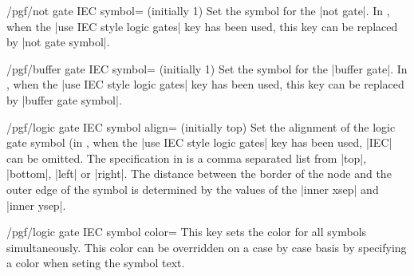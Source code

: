 \begin{key}{/pgf/not gate IEC symbol= (initially 1)}
  Set the symbol for the |not gate|.  
  In \tikzname, when the |use IEC style logic gates| key has been 
  used, this key can be replaced by |not gate symbol|.
\end{key}

\begin{key}{/pgf/buffer gate IEC symbol= (initially 1)}
  Set the symbol for the |buffer gate|.  
  In \tikzname, when the |use IEC style logic gates| key has been 
  used, this key can be replaced by |buffer gate symbol|.
\end{key}

\begin{key}{/pgf/logic gate IEC symbol align= (initially top)}
  Set the alignment of the logic gate symbol (in \tikzname, when the 
  |use IEC style logic gates| key has been used, |IEC| can be omitted.
  The specification in  is a comma separated list from
  |top|, |bottom|, |left| or |right|. The distance between the border
  of the node and the outer edge of the symbol is determined by the values 
  of the |inner xsep| and |inner ysep|.
  
\begin{codeexample}[]
\end{codeexample} 

\end{key}


\begin{key}{/pgf/logic gate IEC symbol color=}
  This key sets the color for all symbols simultaneously. This color
  can be overridden on a case by case basis by specifying a color
  when seting the symbol text.
\end{key}


